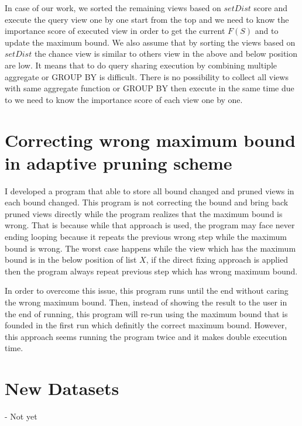 \documentclass{article}
\begin{document}
In case of our work, we sorted the remaining views based on $setDist$ score and execute the query view one by one start from the top and we need to know the importance score of executed view in order to get the current $ F(S) $ and to update the maximum bound. We also assume that by sorting the views based on $setDist$ the chance view is similar to others view in the above and below position are low. It means that to do query sharing execution by combining multiple aggregate or GROUP BY is difficult. There is no possibility to collect all views with same aggregate function or GROUP BY then execute in the same time due to we need to know the importance score of each view one by one.     

\section{Correcting wrong maximum bound in adaptive pruning scheme}
I developed a program that able to store all bound changed and pruned views in each bound changed. This program is not correcting the bound and bring back pruned views directly while the program realizes that the maximum bound is wrong. That is because while that approach is used, the program may face never ending looping because it repeats the previous wrong step while the maximum bound is wrong. The worst case happens while the view which has the maximum bound is in the below position of list $ X $, if the direct fixing approach is applied then the program always repeat previous step which has wrong maximum bound. 

In order to overcome this issue, this program runs until the end without caring the wrong maximum bound. Then, instead of showing the result to the user in the end of running, this program will re-run using the maximum bound that is founded in the first run which definitly the correct maximum bound. However, this approach seems running the program twice and it makes double execution time. 

\section{New Datasets}
- Not yet
\end{document}
